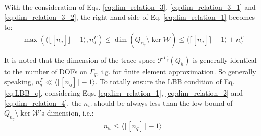 With the consideration of Eqs. \eqref{eq:dim_relation_3}, \eqref{eq:dim_relation_3_1} and \eqref{eq:dim_relation_3_2}, the right-hand side of Eq. \eqref{eq:dim_relation_1} becomes to:
\begin{equation}\label{eq:dim_relation_4}
\max(\langle\lfloor[n_q]\rfloor-1\rangle,n_q^\Gamma)
\le\dim(Q_{n_q}\setminus\ker\mathcal W)\le
\langle\lceil[n_q]\rceil-1\rangle + n_q^\Gamma
\end{equation}

It is noted that the dimension of the trace space $\mathcal T^{\Gamma_q}(Q_h)$ is generally identical to the number of DOFs on $\Gamma_q$, i.g. for finite element approximation.
So generally speaking, $n_q^\Gamma \ll \langle\lfloor[n_q]\rfloor-1\rangle$.
To totally ensure the LBB condition of Eq. \eqref{eq:LBB_q}, considering Eqs. \eqref{eq:dim_relation_1}, \eqref{eq:dim_relation_2} and \eqref{eq:dim_relation_4}, the $n_w$ should be always less than the low bound of $Q_{n_q}\setminus\ker\mathcal W$'s dimension, i.e.:  
\begin{equation}\label{eq:dim_relation_5}
    n_w \le \langle\lfloor[n_q]\rfloor-1\rangle
\end{equation}



